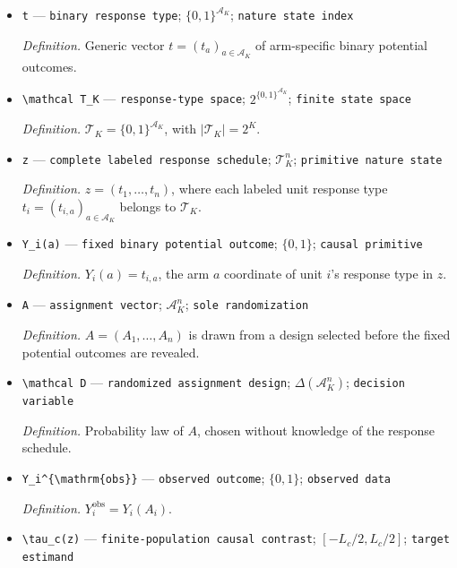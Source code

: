 \documentclass{article}
\begin{document}
\begin{itemize}
  \par\smallskip\noindent\emph{Definition.} \(q_a^\star=|c_a|/L_c\) for \(a\in S_c\) and \(q_a^\star=0\) otherwise.
  \item \texttt{t} --- \texttt{binary response type}; \(\{0,1\}^{\mathcal A_K}\); \texttt{nature state index}
  \par\smallskip\noindent\emph{Definition.} Generic vector \(t=(t_a)_{a\in\mathcal A_K}\) of arm-specific binary potential outcomes.
  \item \texttt{\textbackslash{}\allowbreak{}mathcal T\_\allowbreak{}K} --- \texttt{response-\allowbreak{}type space}; \(2^{\{0,1\}^{\mathcal A_K}}\); \texttt{finite state space}
  \par\smallskip\noindent\emph{Definition.} \(\mathcal T_K=\{0,1\}^{\mathcal A_K}\), with \(|\mathcal T_K|=2^K\).
  \item \texttt{z} --- \texttt{complete labeled response schedule}; \(\mathcal T_K^n\); \texttt{primitive nature state}
  \par\smallskip\noindent\emph{Definition.} \(z=(t_1,\ldots,t_n)\), where each labeled unit response type \(t_i=(t_{i,a})_{a\in\mathcal A_K}\) belongs to \(\mathcal T_K\).
  \item \texttt{Y\_\allowbreak{}i(a)} --- \texttt{fixed binary potential outcome}; \(\{0,1\}\); \texttt{causal primitive}
  \par\smallskip\noindent\emph{Definition.} \(Y_i(a)=t_{i,a}\), the arm \(a\) coordinate of unit \(i\)'s response type in \(z\).
  \item \texttt{A} --- \texttt{assignment vector}; \(\mathcal A_K^n\); \texttt{sole randomization}
  \par\smallskip\noindent\emph{Definition.} \(A=(A_1,\ldots,A_n)\) is drawn from a design selected before the fixed potential outcomes are revealed.
  \item \texttt{\textbackslash{}\allowbreak{}mathcal D} --- \texttt{randomized assignment design}; \(\Delta(\mathcal A_K^n)\); \texttt{decision variable}
  \par\smallskip\noindent\emph{Definition.} Probability law of \(A\), chosen without knowledge of the response schedule.
  \item \texttt{Y\_\allowbreak{}i\textasciicircum{}\{\textbackslash{}\allowbreak{}mathrm\{obs\}\allowbreak{}\}\allowbreak{}} --- \texttt{observed outcome}; \(\{0,1\}\); \texttt{observed data}
  \par\smallskip\noindent\emph{Definition.} \(Y_i^{\mathrm{obs}}=Y_i(A_i)\).
  \item \texttt{\textbackslash{}\allowbreak{}tau\_\allowbreak{}c(z)} --- \texttt{finite-\allowbreak{}population causal contrast}; \([-L_c/2,L_c/2]\); \texttt{target estimand}

\end{itemize}
\end{document}
